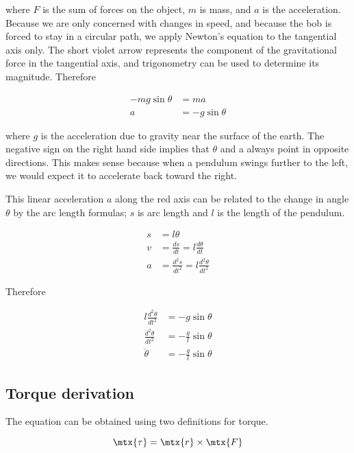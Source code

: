 where $F$ is the sum of forces on the object, $m$ is mass, and $a$ is the
acceleration. Because we are only concerned with changes in speed, and because
the bob is forced to stay in a circular path, we apply Newton's equation to the
tangential axis only. The short violet arrow represents the component of the
gravitational force in the tangential axis, and trigonometry can be used to
determine its magnitude. Therefore

\begin{align*}
  -mg\sin\theta &= ma \\
  a &= -g\sin\theta
\end{align*}

where $g$ is the acceleration due to gravity near the surface of the earth. The
negative sign on the right hand side implies that $\theta$ and a always point in
opposite directions. This makes sense because when a pendulum swings further to
the left, we would expect it to accelerate back toward the right.

This linear acceleration $a$ along the red axis can be related to the change in
angle $\theta$ by the arc length formulas; $s$ is arc length and $l$ is the
length of the pendulum.

\begin{align}
  s &= l\theta \label{eq:arc_length} \\
  v &= \frac{ds}{dt} = l\frac{d\theta}{dt} \nonumber \\
  a &= \frac{d^2s}{dt^2} = l\frac{d^2\theta}{dt^2} \nonumber
\end{align}

Therefore

\begin{align*}
  l\frac{d^2\theta}{dt^2} &= -g\sin\theta \\
  \frac{d^2\theta}{dt^2} &= -\frac{g}{l}\sin\theta \\
  \ddot{\theta} &= -\frac{g}{l}\sin\theta
\end{align*}

\subsection{Torque derivation}

The equation can be obtained using two definitions for torque.

\begin{equation*}
  \mtx{\tau} = \mtx{r} \times \mtx{F}
\end{equation*}

